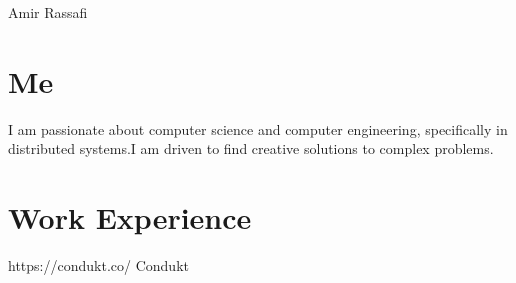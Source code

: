 \documentclass[
	10pt, %
]{FreemanCV}
\begin{document}
\begin{paracol}{2} %


\parbox[][0.09\textheight][c]{\linewidth}{ %
	\centering %

\medskip %
\medskip %
\medskip %

{\sffamily\Huge Amir Rassafi} %


\vfill %
}


\section{Me}

I am passionate about computer science and computer engineering, specifically in distributed systems.I am driven to find creative solutions to complex problems.

\medskip %


\section{Work Experience}




\company
{https://condukt.co/}
{Condukt}
{}
{}



\end{paracol}
\end{document}
